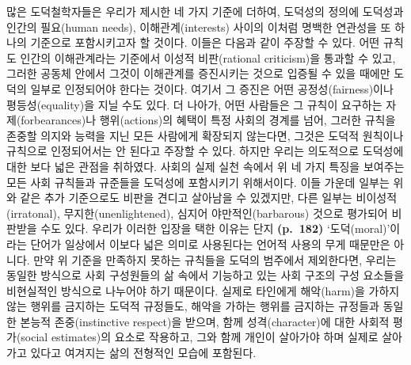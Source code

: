 많은 도덕철학자들은 우리가 제시한 네 가지 기준에 더하여, 도덕성의 정의에
도덕성과 인간의 필요(human needs), 이해관계(interests) 사이의 이처럼
명백한 연관성을 또 하나의 기준으로 포함시키고자 할 것이다. 이들은 다음과
같이 주장할 수 있다. 어떤 규칙도 인간의 이해관계라는 기준에서 이성적
비판(rational criticism)을 통과할 수 있고, 그러한 공동체 안에서 그것이
이해관계를 증진시키는 것으로 입증될 수 있을 때에만 도덕의 일부로
인정되어야 한다는 것이다. 여기서 그 증진은 어떤 공정성(fairness)이나
평등성(equality)을 지닐 수도 있다. 더 나아가, 어떤 사람들은 그 규칙이
요구하는 자제(forbearances)나 행위(actions)의 혜택이 특정 사회의 경계를
넘어, 그러한 규칙을 존중할 의지와 능력을 지닌 모든 사람에게 확장되지
않는다면, 그것은 도덕적 원칙이나 규칙으로 인정되어서는 안 된다고 주장할
수 있다. 하지만 우리는 의도적으로 도덕성에 대한 보다 넓은 관점을
취하였다. 사회의 실제 실천 속에서 위 네 가지 특징을 보여주는 모든 사회
규칙들과 규준들을 도덕성에 포함시키기 위해서이다. 이들 가운데 일부는
위와 같은 추가 기준으로도 비판을 견디고 살아남을 수 있겠지만, 다른
일부는 비이성적(irratonal), 무지한(unenlightened), 심지어
야만적인(barbarous) 것으로 평가되어 비판받을 수도 있다. 우리가 이러한
입장을 택한 이유는 단지 \textbf{(p.~182)} `도덕(moral)'이라는 단어가
일상에서 이보다 넓은 의미로 사용된다는 언어적 사용의 무게 때문만은
아니다. 만약 위 기준을 만족하지 못하는 규칙들을 도덕의 범주에서
제외한다면, 우리는 동일한 방식으로 사회 구성원들의 삶 속에서 기능하고
있는 사회 구조의 구성 요소들을 비현실적인 방식으로 나누어야 하기
때문이다. 실제로 타인에게 해악(harm)을 가하지 않는 행위를 금지하는
도덕적 규정들도, 해악을 가하는 행위를 금지하는 규정들과 동일한 본능적
존중(instinctive respect)을 받으며, 함께 성격(character)에 대한 사회적
평가(social estimates)의 요소로 작용하고, 그와 함께 개인이 살아가야 하며
실제로 살아가고 있다고 여겨지는 삶의 전형적인 모습에 포함된다.

